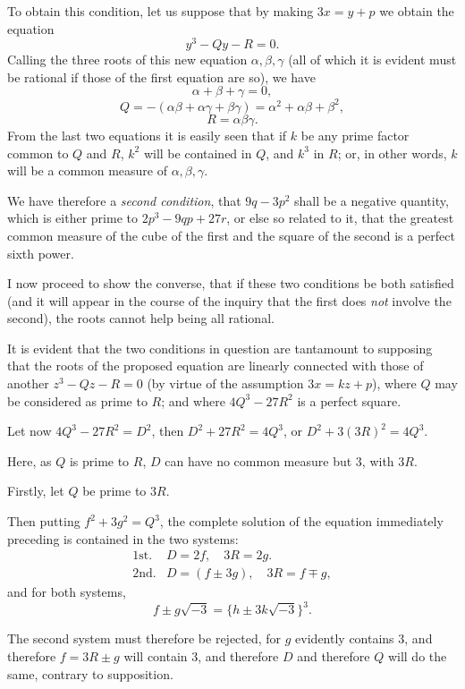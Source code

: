 \documentclass[11pt]{article}
\newcommand{\sourcepage}[1]{\marginpar{\scriptsize p.~#1}}
\begin{document}
{{To obtain this condition, let us suppose that by making $3x=y+p$ we obtain the equation
\[
y^3-Qy-R=0.
\]
Calling the three roots of this new equation $\alpha,\beta,\gamma$ (all of which it is evident must be rational if those of the first equation are so), we have
\[
\alpha+\beta+\gamma=0,
\]
\[
Q=-(\alpha\beta+\alpha\gamma+\beta\gamma)=\alpha^2+\alpha\beta+\beta^2,
\]
\[
R=\alpha\beta\gamma.
\]
From the last two equations it is easily seen that if $k$ be any prime factor common to $Q$ and $R$, $k^2$ will be contained in $Q$, and $k^3$ in $R$; or, in other words, $k$ will be a common measure of $\alpha,\beta,\gamma$.

We have therefore a \emph{second condition}, that $9q-3p^2$ shall be a negative quantity, which is either prime to $2p^3-9qp+27r$, or else so related to it, that the greatest common measure of the cube of the first and the square of the second is a perfect sixth power.

I now proceed to show the converse, that if these two conditions be both satisfied (and it will appear in the course of the inquiry that the first does \emph{not} involve the second), the roots cannot help being all rational.

It is evident that the two conditions in question are tantamount to supposing that the roots of the proposed equation are linearly connected with those of another $z^3-Qz-R=0$ (by virtue of the assumption $3x=kz+p$), where $Q$ may be considered as prime to $R$; and where $4Q^3-27R^2$ is a perfect square.

Let now $4Q^3-27R^2=D^2$, then $D^2+27R^2=4Q^3$, or $D^2+3(3R)^2=4Q^3$.

Here, as $Q$ is prime to $R$, $D$ can have no common measure but 3, with $3R$.

Firstly, let $Q$ be prime to $3R$.

Then putting $f^2+3g^2=Q^3$, the complete solution of the equation immediately preceding is contained in the two systems:
\[
\begin{array}{ll}
\text{1st.}&D=2f,\quad 3R=2g.\\
\text{2nd.}&D=(f\pm3g),\quad 3R=f\mp g,
\end{array}
\]
and for both systems,
\[
f\pm g\sqrt{-3}=\{h\pm3k\sqrt{-3}\}^3.
\]

\sourcepage{105}
The second system must therefore be rejected, for $g$ evidently contains 3, and therefore $f=3R\pm g$ will contain 3, and therefore $D$ and therefore $Q$ will do the same, contrary to supposition.

}}
\end{document}
